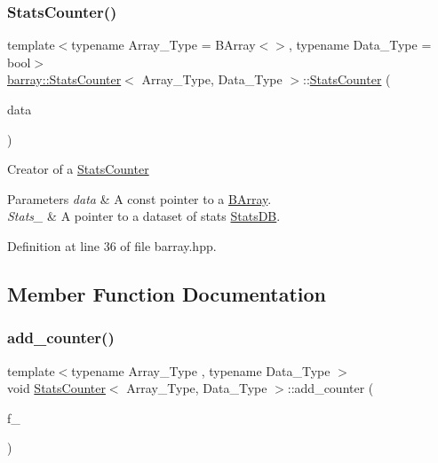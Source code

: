 \subsubsection{\texorpdfstring{Stats\+Counter()}{StatsCounter()}}
{\footnotesize\ttfamily template$<$typename Array\+\_\+\+Type  = B\+Array$<$$>$, typename Data\+\_\+\+Type  = bool$>$ \\
\hyperlink{classbarray_1_1_stats_counter}{barray\+::\+Stats\+Counter}$<$ Array\+\_\+\+Type, Data\+\_\+\+Type $>$\+::\hyperlink{classbarray_1_1_stats_counter}{Stats\+Counter} (\begin{DoxyParamCaption}\item[{const Array\+\_\+\+Type $\ast$}]{data }\end{DoxyParamCaption})\hspace{0.3cm}{\ttfamily [inline]}}



Creator of a {\ttfamily \hyperlink{classbarray_1_1_stats_counter}{Stats\+Counter}} 


\begin{DoxyParams}{Parameters}
{\em data} & A const pointer to a {\ttfamily \hyperlink{classbarray_1_1_b_array}{B\+Array}}. \\
\hline
{\em Stats\+\_\+} & A pointer to a dataset of stats {\ttfamily \hyperlink{classbarray_1_1_stats_d_b}{Stats\+DB}}. \\
\hline
\end{DoxyParams}


Definition at line 36 of file barray.\+hpp.



\subsection{Member Function Documentation}
\mbox{\label{classbarray_1_1_stats_counter_ad175dcd2bd30d017881783de546ac333}} 
\subsubsection{\texorpdfstring{add\+\_\+counter()}{add\_counter()}}
{\footnotesize\ttfamily template$<$typename Array\+\_\+\+Type , typename Data\+\_\+\+Type $>$ \\
void \hyperlink{classbarray_1_1_stats_counter}{Stats\+Counter}$<$ Array\+\_\+\+Type, Data\+\_\+\+Type $>$\+::add\+\_\+counter (\begin{DoxyParamCaption}\item[{\hyperlink{classbarray_1_1_counter}{Counter}$<$ Array\+\_\+\+Type, Data\+\_\+\+Type $>$}]{f\+\_\+ }\end{DoxyParamCaption})\hspace{0.3cm}{\ttfamily [inline]}}




